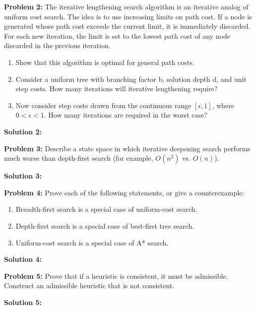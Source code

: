 \documentclass[]{article}
\begin{document}
\clearpage

\textbf{Problem 2:}
The iterative lengthening search algorithm is an iterative analog of uniform cost search. The idea is to use increasing limits on path cost. If a node is generated whose path cost exceeds the current limit, it is immediately discarded. For each new iteration, the limit is set to the lowest path cost of any node discarded in the previous iteration.

\begin{enumerate}[label=(\alph*)]
    \item Show that this algorithm is optimal for general path costs.
    \item Consider a uniform tree with branching factor b, solution depth d, and unit step costs. How many iterations will iterative lengthening require?
    \item Now consider step costs drawn from the continuous range $[\epsilon, 1]$, where $0 < \epsilon < 1$. How many iterations are required in the worst case?
\end{enumerate}

\bigskip

\textbf{Solution 2:}

\clearpage

\textbf{Problem 3:}
Describe a state space in which iterative deepening search performs much worse than depth-first search (for example, $O(n^2)$ vs. $O(n)$).
\bigskip

\textbf{Solution 3:}

\clearpage

\textbf{Problem 4:}
Prove each of the following statements, or give a counterexample:
\begin{enumerate}[label=(\alph*)]
    \item Breadth-first search is a special case of uniform-cost search.
    \item Depth-first search is a special case of best-first tree search.
    \item Uniform-cost search is a special case of A* search.
\end{enumerate}
\bigskip

\textbf{Solution 4:}

\clearpage

\textbf{Problem 5:}
Prove that if a heuristic is consistent, it must be admissible. Construct an admissible heuristic that is not consistent.
\bigskip

\textbf{Solution 5:}
\end{document}
